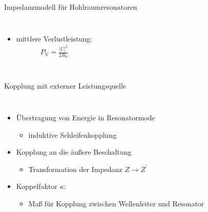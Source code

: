 \documentclass[12pt,xcolor=dvipsnames,professionalfonts]{beamer}
\begin{document}
\begin{frame}{Impedanzmodell für Hohlraumresonatoren}
\begin{columns}[T]
		\begin{itemize}
			\item mittlere Verlustleistung:
			\begin{align*}
				P_\mathrm{V} = \frac{\left|U\right|^2}{2 R_\mathrm{S}}
			\end{align*}
		\end{itemize}
	\end{columns}
	

\end{frame}

\begin{frame}{Kopplung mit externer Leistungsquelle}
	\begin{columns}[c]
		\begin{itemize}
			\setlength\itemsep{1.25em}
			\item Übertragung von Energie in Resonatormode
			\begin{itemize}
				\setlength\itemsep{0.25em}
				\item induktive Schleifenkopplung
			\end{itemize}
			
			\item Kopplung an die äußere Beschaltung
			\begin{itemize}
				\setlength\itemsep{0.25em}
				\item Transformation der Impedanz $Z \rightarrow Z^\prime$
			\end{itemize}
			
			\item Koppelfaktor $\kappa$:
			\begin{itemize}
				\setlength\itemsep{0.25em}
				\item Maß für Kopplung zwischen Wellenleiter und Resonator\setlength\itemsep{0.25em}
			\end{itemize}
		\end{itemize}
		

\end{columns}
\end{frame}
\end{document}
